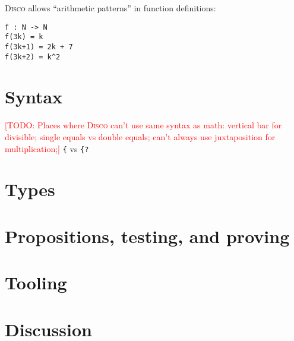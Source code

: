 \documentclass[submission,copyright,creativecommons]{eptcs}
\newcommand{\disco}{\textsc{Disco}\xspace}
\newcommand{\todo}[1]{\textcolor{red}{[TODO: #1]}}
\newcommand{\todo}[1]{}
\begin{document}
\disco allows ``arithmetic patterns'' in function definitions:
\begin{verbatim}
f : N -> N
f(3k) = k
f(3k+1) = 2k + 7
f(3k+2) = k^2
\end{verbatim}

\section{Syntax}

\todo{Places where \disco can't use same syntax as math: vertical bar for
divisible; single equals vs double equals; can't always use
juxtaposition for multiplication;} \verb|{| vs \verb|{?|

\section{Types}
\label{sec:types}

\section{Propositions, testing, and proving}
\label{sec:props}

\section{Tooling}
\label{sec:tools}

\section{Discussion}
\label{sec:discussion}

\cite{Yorgey:2012:promotion}
\end{document}
